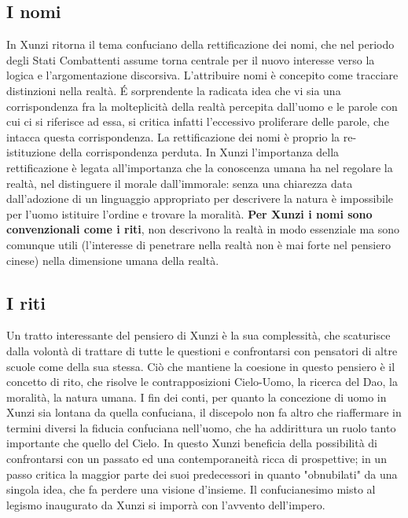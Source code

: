 \documentclass[10pt,a4paper]{report}
\begin{document}
\subsection{I nomi}
In Xunzi ritorna il tema confuciano della rettificazione dei nomi, che nel periodo degli Stati Combattenti assume torna centrale per il nuovo interesse verso la logica e l'argomentazione discorsiva. L'attribuire nomi è concepito come tracciare distinzioni nella realtà. \'E sorprendente la radicata idea che vi sia una corrispondenza fra la molteplicità della realtà percepita dall'uomo e le parole con cui ci si riferisce ad essa, si critica infatti l'eccessivo proliferare delle parole, che intacca questa corrispondenza. La rettificazione dei nomi è proprio la re-istituzione della corrispondenza perduta. In Xunzi l'importanza della rettificazione è legata all'importanza che la conoscenza umana ha nel regolare la realtà, nel distinguere il morale dall'immorale: senza una chiarezza data dall'adozione di un linguaggio appropriato per descrivere la natura è impossibile per l'uomo istituire l'ordine e trovare la moralità. \textbf{Per Xunzi i nomi sono convenzionali come i riti}, non descrivono la realtà in modo essenziale ma sono comunque utili (l'interesse di penetrare nella realtà non è mai forte nel pensiero cinese) nella dimensione umana della realtà. 
\subsection{I riti}
 Un tratto interessante del pensiero di Xunzi è la sua complessità, che scaturisce dalla volontà di trattare di tutte le questioni e confrontarsi con pensatori di altre scuole come della sua stessa. Ciò che mantiene la coesione in questo pensiero è il concetto di rito, che risolve le contrapposizioni Cielo-Uomo, la ricerca del Dao, la moralità, la natura umana. I fin dei conti, per quanto la concezione di uomo in Xunzi sia lontana da quella confuciana, il discepolo non fa altro che riaffermare in termini diversi la fiducia confuciana nell'uomo, che ha addirittura un ruolo tanto importante che quello del Cielo. In questo Xunzi beneficia della possibilità di confrontarsi con un passato ed una contemporaneità ricca di prospettive; in un passo critica la maggior parte dei suoi predecessori in quanto "obnubilati" da una singola idea, che fa perdere una visione d'insieme. Il confucianesimo misto al legismo inaugurato da Xunzi si imporrà con l'avvento dell'impero. 
\end{document}
